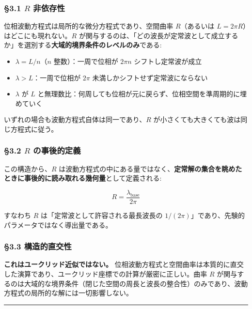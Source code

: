 \documentclass[
  a4paper,11pt]{ltjsarticle}
\providecommand{\tightlist}{%
  \setlength{\itemsep}{0pt}\setlength{\parskip}{0pt}}
\theoremstyle{definition}
\theoremstyle{remark}
\begin{document}
\subsubsection{\texorpdfstring{§3.1 \(R\)
非依存性}{§3.1 R 非依存性}}\label{r-ux975eux4f9dux5b58ux6027}

位相波動方程式は局所的な微分方程式であり、空間曲率 \(R\)（あるいは
\(L = 2\pi R\)）はどこにも現れない。\(R\)
が関与するのは、「どの波長が定常波として成立するか」を選別する\textbf{大域的境界条件のレベルのみ}である:

\begin{itemize}
\tightlist
\item
  \(\lambda = L/n\)（\(n\) 整数）：一周で位相が \(2\pi n\)
  シフトし定常波が成立
\item
  \(\lambda > L\)：一周で位相が \(2\pi\)
  未満しかシフトせず定常波にならない
\item
  \(\lambda\) が \(L\)
  と無理数比：何周しても位相が元に戻らず、位相空間を準周期的に埋めていく
\end{itemize}

いずれの場合も波動方程式自体は同一であり、\(R\)
が小さくても大きくても波は同じ方程式に従う。

\subsubsection{\texorpdfstring{§3.2 \(R\)
の事後的定義}{§3.2 R の事後的定義}}\label{r-ux306eux4e8bux5f8cux7684ux5b9aux7fa9}

この構造から、\(R\)
は波動方程式の中にある量ではなく、\textbf{定常解の集合を眺めたときに事後的に読み取れる幾何量}として定義される:

\[R = \frac{\lambda_{\text{base}}}{2\pi}\]

すなわち \(R\) は「定常波として許容される最長波長の
\(1/(2\pi)\)」であり、先験的パラメータではなく導出量である。

\subsubsection{§3.3
構造的直交性}\label{ux69cbux9020ux7684ux76f4ux4ea4ux6027}

\textbf{これはユークリッド近似ではない。}
位相波動方程式と空間曲率は本質的に直交した演算であり、ユークリッド座標での計算が厳密に正しい。曲率
\(R\)
が関与するのは大域的な境界条件（閉じた空間の周長と波長の整合性）のみであり、波動方程式の局所的な解には一切影響しない。

\begin{center}\rule{0.5\linewidth}{0.5pt}\end{center}
\end{document}
